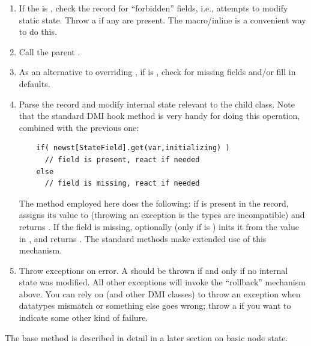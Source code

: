 \documentclass[10pt,twoside]{book}
\begin{document}
\begin{enumerate}

  \item If the  is , check the record for
    ``forbidden'' fields, i.e., attempts to modify static state. Throw a
     if any are present. The
      macro/inline is a convenient way to
    do this.
    
  \item Call the parent .

  \item As an alternative to overriding , if
     is , check for missing fields and/or fill in
    defaults.

  \item Parse the record and modify internal state relevant to the child class.
    Note that the standard DMI hook method  is very handy for doing
    this operation, combined with the previous one:
    
    \begin{verbatim}
    if( newst[StateField].get(var,initializing) )
      // field is present, react if needed
    else
      // field is missing, react if needed
    \end{verbatim}
    
    The  method employed here does the following: if 
    is present in the  record, assigns its value to 
    (throwing an exception is the types are incompatible) and returns
    . If the field is missing, optionally (only if 
    is ) inits it from the value in , and returns .
    The standard  methods make extended use of this
    mechanism.

  \item Throw exceptions on error. A  should be
    thrown if and only if no internal state was modified. All other exceptions
    will invoke the ``rollback'' mechanism above. You can rely on
     (and other DMI classes) to throw an exception when
    datatypes mismatch or something else goes wrong; throw a
     if you want to indicate some other kind of
    failure.

\end{enumerate}

  The base  method is described in detail in a later
  section on basic node state.
\end{document}
